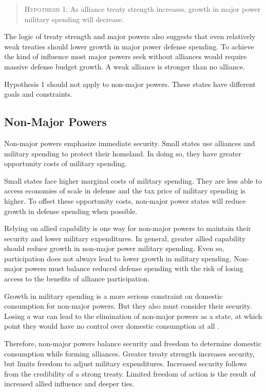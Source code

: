 \documentclass[12pt]{article}
\begin{document}
\begin{quote}
\textsc{Hypothesis 1}: As alliance treaty strength increases, growth in major power military spending will decrease. 
\end{quote}


The logic of treaty strength and major powers also suggests that even relatively weak treaties should lower growth in major power defense spending. 
To achieve the kind of influence most major powers seek without alliances would require massive defense budget growth. 
A weak alliance is stronger than no alliance. 


Hypothesis 1 should not apply to non-major powers. 
These states have different goals and constraints. 


\subsection{Non-Major Powers} 


Non-major powers emphasize immediate security.
Small states use alliances and military spending to protect their homeland.  
In doing so, they have greater opportunity costs of military spending. 


Small states face higher marginal costs of military spending. 
They are less able to access economies of scale in defense and the tax price of military spending is higher.  
To offset these opportunity costs, non-major power states will reduce growth in defense spending when possible.


Relying on allied capability is one way for non-major powers to maintain their security and lower military expenditures.  
In general, greater allied capability should reduce growth in non-major power military spending. 
Even so, participation does not always lead to lower growth in military spending. 
Non-major powers must balance reduced defense spending with the risk of losing access to the benefits of alliance participation. 


Growth in military spending is a more serious constraint on domestic consumption for non-major powers. 
But they also must consider their security. 
Losing a war can lead to the elimination of non-major powers as a state, at which point they would have no control over domestic consumption at all \citep{Fazal2011}. 


Therefore, non-major powers balance security and freedom to determine domestic consumption while forming alliances. 
Greater treaty strength increases security, but limits freedom to adjust military expenditures. 
Increased security follows from the credibility of a strong treaty. 
Limited freedom of action is the result of increased allied influence and deeper ties. 
\end{document}

